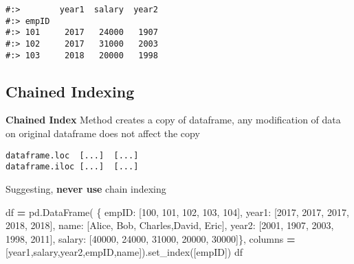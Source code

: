 \documentclass[
]{book}
\newenvironment{Shaded}{\begin{snugshade}}{\end{snugshade}}
\newcommand{\DecValTok}[1]{\textcolor[rgb]{0.06,0.06,0.06}{#1}}
\newcommand{\NormalTok}[1]{#1}
\newcommand{\OperatorTok}[1]{\textcolor[rgb]{0.43,0.43,0.43}{\textbf{#1}}}
\newcommand{\StringTok}[1]{\textcolor[rgb]{0.5,0.5,0.5}{#1}}
\begin{document}
\begin{verbatim}
#:>        year1  salary  year2
#:> empID                      
#:> 101     2017   24000   1907
#:> 102     2017   31000   2003
#:> 103     2018   20000   1998
\end{verbatim}

\hypertarget{chained-indexing}{%
\subsection{Chained Indexing}\label{chained-indexing}}

\textbf{Chained Index} Method creates a copy of dataframe, any modification of data on original dataframe does not affect the copy

\begin{verbatim}
dataframe.loc  [...]  [...]
dataframe.iloc [...]  [...]
\end{verbatim}

Suggesting, \textbf{never use} chain indexing

\begin{Shaded}
\begin{Highlighting}[]
\NormalTok{df }\OperatorTok{=}\NormalTok{ pd.DataFrame(}
\NormalTok{    \{ }\StringTok{\textquotesingle{}empID\textquotesingle{}}\NormalTok{:  [}\DecValTok{100}\NormalTok{,      }\DecValTok{101}\NormalTok{,    }\DecValTok{102}\NormalTok{,      }\DecValTok{103}\NormalTok{,     }\DecValTok{104}\NormalTok{],}
      \StringTok{\textquotesingle{}year1\textquotesingle{}}\NormalTok{:   [}\DecValTok{2017}\NormalTok{,     }\DecValTok{2017}\NormalTok{,   }\DecValTok{2017}\NormalTok{,      }\DecValTok{2018}\NormalTok{,    }\DecValTok{2018}\NormalTok{],}
      \StringTok{\textquotesingle{}name\textquotesingle{}}\NormalTok{:   [}\StringTok{\textquotesingle{}Alice\textquotesingle{}}\NormalTok{,  }\StringTok{\textquotesingle{}Bob\textquotesingle{}}\NormalTok{,  }\StringTok{\textquotesingle{}Charles\textquotesingle{}}\NormalTok{,}\StringTok{\textquotesingle{}David\textquotesingle{}}\NormalTok{, }\StringTok{\textquotesingle{}Eric\textquotesingle{}}\NormalTok{],}
      \StringTok{\textquotesingle{}year2\textquotesingle{}}\NormalTok{:   [}\DecValTok{2001}\NormalTok{,     }\DecValTok{1907}\NormalTok{,   }\DecValTok{2003}\NormalTok{,      }\DecValTok{1998}\NormalTok{,    }\DecValTok{2011}\NormalTok{],}
      \StringTok{\textquotesingle{}salary\textquotesingle{}}\NormalTok{: [}\DecValTok{40000}\NormalTok{,    }\DecValTok{24000}\NormalTok{,  }\DecValTok{31000}\NormalTok{,     }\DecValTok{20000}\NormalTok{,   }\DecValTok{30000}\NormalTok{]\},}
\NormalTok{    columns }\OperatorTok{=}\NormalTok{ [}\StringTok{\textquotesingle{}year1\textquotesingle{}}\NormalTok{,}\StringTok{\textquotesingle{}salary\textquotesingle{}}\NormalTok{,}\StringTok{\textquotesingle{}year2\textquotesingle{}}\NormalTok{,}\StringTok{\textquotesingle{}empID\textquotesingle{}}\NormalTok{,}\StringTok{\textquotesingle{}name\textquotesingle{}}\NormalTok{]).set\_index([}\StringTok{\textquotesingle{}empID\textquotesingle{}}\NormalTok{])}
\NormalTok{df}
\end{Highlighting}
\end{Shaded}
\end{document}
